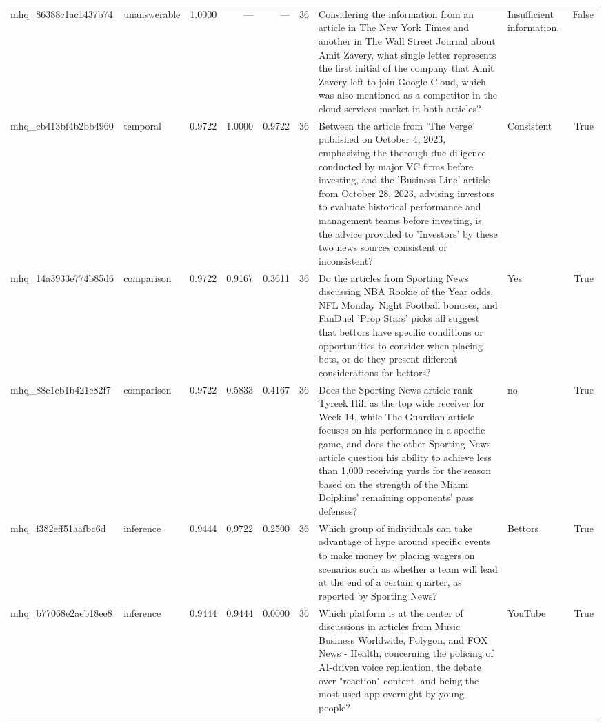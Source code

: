 \begin{tabular}{llrrrrllr}
mhq_86388c1ac1437b74 & unanswerable & 1.0000 & — & — & 36 & Considering the information from an article in The New York Times and another in The Wall Street Journal about Amit Zavery, what single letter represents the first initial of the company that Amit Zavery left to join Google Cloud, which was also mentioned as a competitor in the cloud services market in both articles? & Insufficient information. & False \\
mhq_cb413bf4b2bb4960 & temporal & 0.9722 & 1.0000 & 0.9722 & 36 & Between the article from 'The Verge' published on October 4, 2023, emphasizing the thorough due diligence conducted by major VC firms before investing, and the 'Business Line' article from October 28, 2023, advising investors to evaluate historical performance and management teams before investing, is the advice provided to 'Investors' by these two news sources consistent or inconsistent? & Consistent & True \\
mhq_14a3933e774b85d6 & comparison & 0.9722 & 0.9167 & 0.3611 & 36 & Do the articles from Sporting News discussing NBA Rookie of the Year odds, NFL Monday Night Football bonuses, and FanDuel 'Prop Stars' picks all suggest that bettors have specific conditions or opportunities to consider when placing bets, or do they present different considerations for bettors? & Yes & True \\
mhq_88c1cb1b421e82f7 & comparison & 0.9722 & 0.5833 & 0.4167 & 36 & Does the Sporting News article rank Tyreek Hill as the top wide receiver for Week 14, while The Guardian article focuses on his performance in a specific game, and does the other Sporting News article question his ability to achieve less than 1,000 receiving yards for the season based on the strength of the Miami Dolphins' remaining opponents' pass defenses? & no & True \\
mhq_f382eff51aafbc6d & inference & 0.9444 & 0.9722 & 0.2500 & 36 & Which group of individuals can take advantage of hype around specific events to make money by placing wagers on scenarios such as whether a team will lead at the end of a certain quarter, as reported by Sporting News? & Bettors & True \\
mhq_b77068e2aeb18ee8 & inference & 0.9444 & 0.9444 & 0.0000 & 36 & Which platform is at the center of discussions in articles from Music Business Worldwide, Polygon, and FOX News - Health, concerning the policing of AI-driven voice replication, the debate over "reaction" content, and being the most used app overnight by young people? & YouTube & True \\

\end{tabular}
